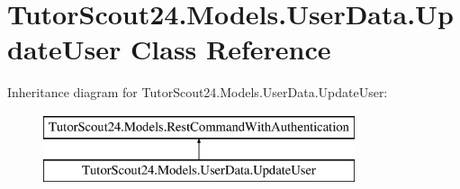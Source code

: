 \hypertarget{class_tutor_scout24_1_1_models_1_1_user_data_1_1_update_user}{}\section{Tutor\+Scout24.\+Models.\+User\+Data.\+Update\+User Class Reference}
\label{class_tutor_scout24_1_1_models_1_1_user_data_1_1_update_user}
Inheritance diagram for Tutor\+Scout24.\+Models.\+User\+Data.\+Update\+User\+:\begin{figure}[H]
\begin{center}
\leavevmode
\includegraphics[height=2.000000cm]{class_tutor_scout24_1_1_models_1_1_user_data_1_1_update_user}
\end{center}
\end{figure}

